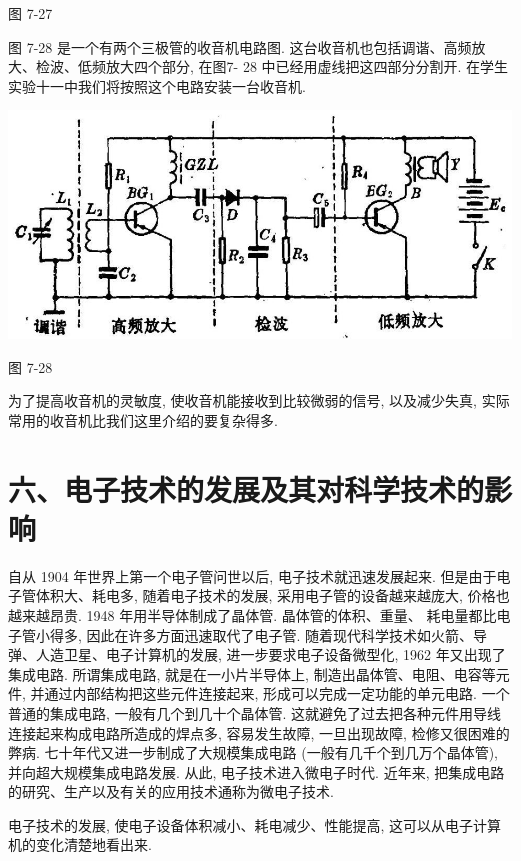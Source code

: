 \documentclass[10pt]{article}
\begin{document}
图 7-27

图 7-28 是一个有两个三极管的收音机电路图. 这台收音机也包括调谐、高频放大、检波、低频放大四个部分, 在图7- 28 中已经用虚线把这四部分分割开. 在学生实验十一中我们将按照这个电路安装一台收音机.

\begin{center}
\includegraphics[max width=1.0\textwidth]{images/01913056-1f15-74d8-9184-9aab52c9d66b_237_945207.jpg}
\end{center}

图 7-28

为了提高收音机的灵敏度, 使收音机能接收到比较微弱的信号, 以及减少失真, 实际常用的收音机比我们这里介绍的要复杂得多.

\section*{六、电子技术的发展及其对科学技术的影响}

自从 1904 年世界上第一个电子管问世以后, 电子技术就迅速发展起来. 但是由于电子管体积大、耗电多, 随着电子技术的发展, 采用电子管的设备越来越庞大, 价格也越来越昂贵. 1948 年用半导体制成了晶体管. 晶体管的体积、重量、 耗电量都比电子管小得多, 因此在许多方面迅速取代了电子管. 随着现代科学技术如火箭、导弹、人造卫星、电子计算机的发展, 进一步要求电子设备微型化, 1962 年又出现了集成电路. 所谓集成电路, 就是在一小片半导体上, 制造出晶体管、电阻、电容等元件, 并通过内部结构把这些元件连接起来, 形成可以完成一定功能的单元电路. 一个普通的集成电路, 一般有几个到几十个晶体管. 这就避免了过去把各种元件用导线连接起来构成电路所造成的焊点多, 容易发生故障, 一旦出现故障, 检修又很困难的弊病. 七十年代又进一步制成了大规模集成电路 (一般有几千个到几万个晶体管), 并向超大规模集成电路发展. 从此, 电子技术进入微电子时代. 近年来, 把集成电路的研究、生产以及有关的应用技术通称为微电子技术.

电子技术的发展, 使电子设备体积减小、耗电减少、性能提高, 这可以从电子计算机的变化清楚地看出来.
\end{document}
